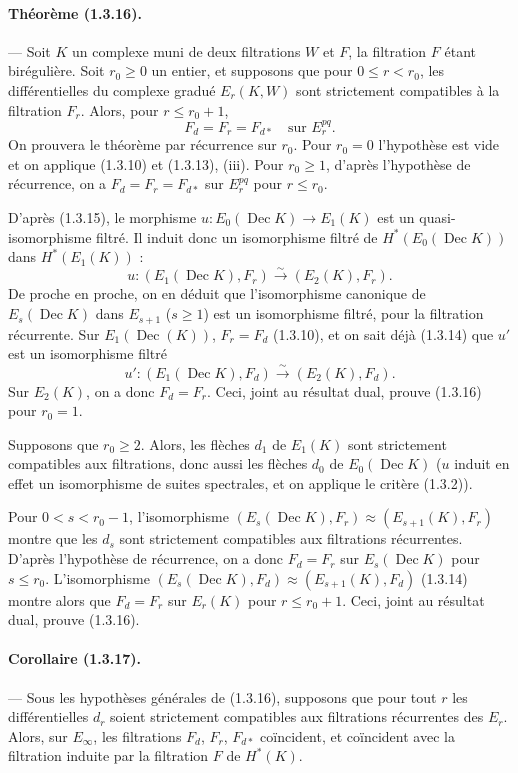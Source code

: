 \documentclass[10pt]{article}
\newcommand{\iso}{\xrightarrow{\sim}}
\newcommand{\Dec}{\operatorname{Dec}}
\begin{document}
\paragraph{Théorème (1.3.16).} --- Soit $K$ un complexe muni de deux filtrations $W$ et $F$, la filtration $F$ étant birégulière. Soit $r_0\ge0$ un entier, et supposons que pour $0\le r<r_0$, les différentielles du complexe gradué $E_r(K,W)$ sont strictement compatibles à la filtration $F_r$. Alors, pour $r\le r_0+1$,
\[
F_d=F_r=F_{d*}\quad\text{sur }E_r^{pq}.
\]
On prouvera le théorème par récurrence sur $r_0$. Pour $r_0=0$ l'hypothèse est vide et on applique (1.3.10) et (1.3.13), (iii). Pour $r_0\ge1$, d'après l'hypothèse de récurrence, on a $F_d=F_r=F_{d*}$ sur $E_r^{pq}$ pour $r\le r_0$.

D'après (1.3.15), le morphisme $u:E_0(\Dec K)\to E_1(K)$ est un quasi-isomorphisme filtré. Il induit donc un isomorphisme filtré de $H^*(E_0(\Dec K))$ dans $H^*(E_1(K))$ :
\[
u:(E_1(\Dec K),F_r)\iso(E_2(K),F_r).
\]
De proche en proche, on en déduit que l'isomorphisme canonique de $E_s(\Dec K)$ dans $E_{s+1}$ ($s\ge1$) est un isomorphisme filtré, pour la filtration récurrente. Sur $E_1(\Dec(K))$, $F_r=F_d$ (1.3.10), et on sait déjà (1.3.14) que $u'$ est un isomorphisme filtré
\[
u':(E_1(\Dec K),F_d)\iso(E_2(K),F_d).
\]
Sur $E_2(K)$, on a donc $F_d=F_r$. Ceci, joint au résultat dual, prouve (1.3.16) pour $r_0=1$.

Supposons que $r_0\ge2$. Alors, les flèches $d_1$ de $E_1(K)$ sont strictement compatibles aux filtrations, donc aussi les flèches $d_0$ de $E_0(\Dec K)$ ($u$ induit en effet un isomorphisme de suites spectrales, et on applique le critère (1.3.2)).

Pour $0<s<r_0-1$, l'isomorphisme $(E_s(\Dec K),F_r)\approx(E_{s+1}(K),F_r)$ montre que les $d_s$ sont strictement compatibles aux filtrations récurrentes. D'après l'hypothèse de récurrence, on a donc $F_d=F_r$ sur $E_s(\Dec K)$ pour $s\le r_0$. L'isomorphisme $(E_s(\Dec K),F_d)\approx(E_{s+1}(K),F_d)$ (1.3.14) montre alors que $F_d=F_r$ sur $E_r(K)$ pour $r\le r_0+1$. Ceci, joint au résultat dual, prouve (1.3.16).

\paragraph{Corollaire (1.3.17).} --- Sous les hypothèses générales de (1.3.16), supposons que pour tout $r$ les différentielles $d_r$ soient strictement compatibles aux filtrations récurrentes des $E_r$. Alors, sur $E_\infty$, les filtrations $F_d$, $F_r$, $F_{d*}$ coïncident, et coïncident avec la filtration induite par la filtration $F$ de $H^*(K)$.
\end{document}
